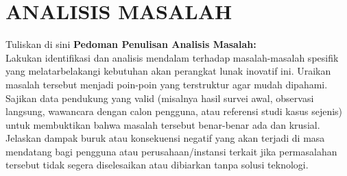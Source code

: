 \chapter{ANALISIS MASALAH}


Tuliskan di sini \textbf{Pedoman Penulisan Analisis Masalah:} \\
Lakukan identifikasi dan analisis mendalam terhadap masalah-masalah spesifik yang melatarbelakangi kebutuhan akan perangkat lunak inovatif ini. Uraikan masalah tersebut menjadi poin-poin yang terstruktur agar mudah dipahami.\\
Sajikan data pendukung yang valid (misalnya hasil survei awal, observasi langsung, wawancara dengan calon pengguna, atau referensi studi kasus sejenis) untuk membuktikan bahwa masalah tersebut benar-benar ada dan krusial.\\
Jelaskan dampak buruk atau konsekuensi negatif yang akan terjadi di masa mendatang bagi pengguna atau perusahaan/instansi terkait jika permasalahan tersebut tidak segera diselesaikan atau dibiarkan tanpa solusi teknologi.

